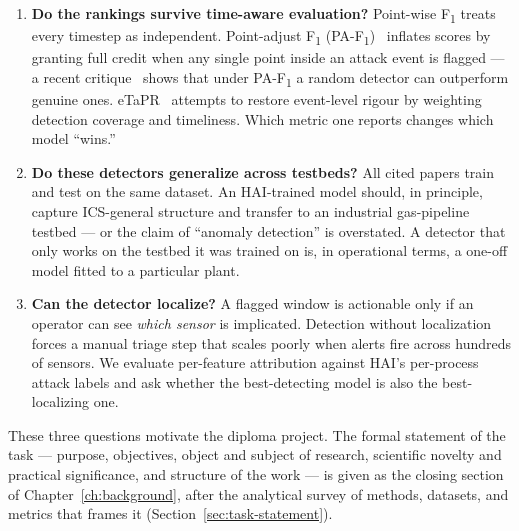 \begin{enumerate}
  \item \textbf{Do the rankings survive time-aware evaluation?}  Point-wise F\textsubscript{1} treats every timestep as independent.  Point-adjust F\textsubscript{1} (PA-F\textsubscript{1})~\cite{xu2018unsupervised} inflates scores by granting full credit when any single point inside an attack event is flagged --- a recent critique~\cite{kim2022towards} shows that under PA-F\textsubscript{1} a random detector can outperform genuine ones.  eTaPR~\cite{hwang2022etapr} attempts to restore event-level rigour by weighting detection coverage and timeliness.  Which metric one reports changes which model ``wins.''
  \item \textbf{Do these detectors generalize across testbeds?}  All cited papers train and test on the same dataset.  An HAI-trained model should, in principle, capture ICS-general structure and transfer to an industrial gas-pipeline testbed --- or the claim of ``anomaly detection'' is overstated.  A detector that only works on the testbed it was trained on is, in operational terms, a one-off model fitted to a particular plant.
  \item \textbf{Can the detector localize?}  A flagged window is actionable only if an operator can see \emph{which sensor} is implicated.  Detection without localization forces a manual triage step that scales poorly when alerts fire across hundreds of sensors.  We evaluate per-feature attribution against HAI's per-process attack labels and ask whether the best-detecting model is also the best-localizing one.
\end{enumerate}

These three questions motivate the diploma project.  The formal statement of the task --- purpose, objectives, object and subject of research, scientific novelty and practical significance, and structure of the work --- is given as the closing section of Chapter~\ref{ch:background}, after the analytical survey of methods, datasets, and metrics that frames it (Section~\ref{sec:task-statement}).
